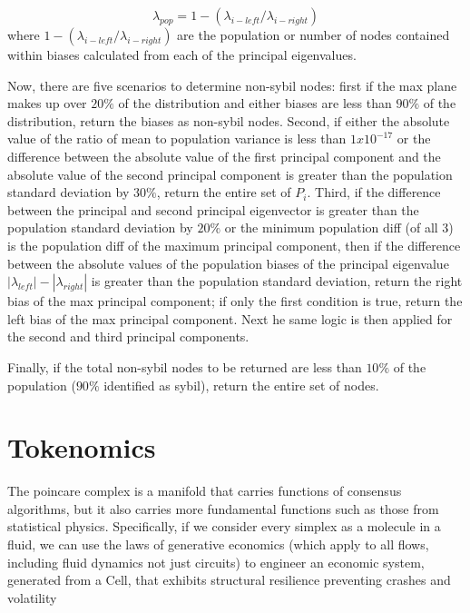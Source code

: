 \documentclass{article}
\begin{document}
\begin{equation}
\lambda_{pop} = 1-(\lambda_{i-left}/\lambda_{i-right})
\end{equation}
where $1-(\lambda_{i-left}/\lambda_{i-right})$  are the population or number of nodes contained within biases calculated from each of the principal eigenvalues.

Now, there are five scenarios to determine non-sybil nodes: first if the max plane makes up over $20\%$ of the distribution and either biases are less than $90\%$ of the distribution, return the biases as non-sybil nodes. Second, if either the absolute value of the ratio of mean to population variance is less than $1x10^{-17}$ or the difference between the absolute value of the first principal component and the  absolute value of the second principal component is greater than the population standard deviation by $30\%$, return the entire set of $P_i$. Third, if the difference between the principal and second principal eigenvector is greater than the population standard deviation by $20\%$ or the minimum population diff (of all 3) is the population diff of the maximum principal component, then if the difference between the absolute values of the population biases of the principal eigenvalue $|\lambda_{left}| - |\lambda_{right}|$ is greater than the population standard deviation, return the right bias of the max principal component; if only the first condition is true, return the left bias of the max principal component. Next he same logic is then applied for the second and third principal components. 

Finally, if the total non-sybil nodes to be returned are less than $10\%$ of the population ($90\%$ identified as sybil), return the entire set of nodes.

\section{Tokenomics}
The poincare complex is a manifold that carries functions of consensus algorithms, but it also carries more fundamental functions such as those from statistical physics. Specifically, if we consider every simplex as a molecule in a fluid, we can use the laws of generative economics (which apply to all flows, including fluid dynamics not just circuits) to engineer an economic system, generated from a Cell, that exhibits structural resilience preventing crashes and volatility
\end{document}
